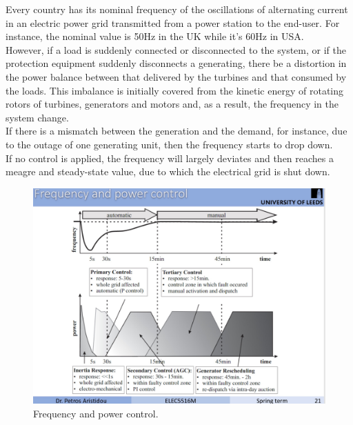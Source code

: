 Every country has its nominal frequency of the oscillations of alternating current in an electric power grid transmitted from a power station to the end-user. For instance, the nominal value is 50Hz \cite{papadopoulos2009distribution} in the UK while it’s 60Hz \cite{komarnicki2008practical} in USA.\\

However, \cite{machowski2011power} if a load is suddenly connected or disconnected to the system, or if the protection equipment suddenly disconnects a generating, there be a distortion in the power balance between that delivered by the turbines and that consumed by the loads. This imbalance is initially covered from \cite{machowski2011power} the kinetic energy of rotating rotors of turbines, generators and motors and, as a result, the frequency in the system change.\\

If there is a mismatch between the generation and the demand, for instance, due to the outage of one generating unit, then the frequency starts to drop down.  \\

If no control is applied, the frequency will largely deviates and then reaches a meagre and steady-state value, due to which the electrical grid is shut down.\\

\begin{figure}[t]
\center
\includegraphics[scale=0.2]{figure/2_1_freq.jpeg}
\caption{Frequency and power control.}
\label{2_1_freq}
\end{figure}

